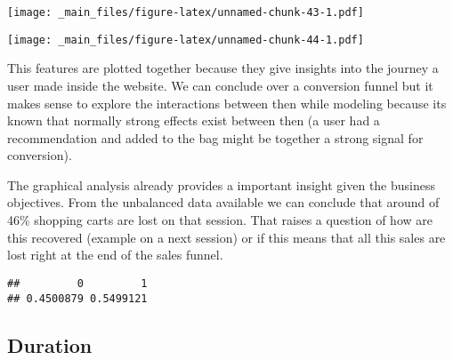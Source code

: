 \documentclass[
]{book}
\newenvironment{Shaded}{\begin{snugshade}}{\end{snugshade}}
\newcommand{\DecValTok}[1]{\textcolor[rgb]{0.00,0.00,0.81}{#1}}
\newcommand{\FunctionTok}[1]{\textcolor[rgb]{0.00,0.00,0.00}{#1}}
\newcommand{\NormalTok}[1]{#1}
\newcommand{\SpecialCharTok}[1]{\textcolor[rgb]{0.00,0.00,0.00}{#1}}
\begin{document}
\texttt{[image: \_main\_files/figure-latex/unnamed-chunk-43-1.pdf]}

\begin{Shaded}
\end{Shaded}

\texttt{[image: \_main\_files/figure-latex/unnamed-chunk-44-1.pdf]}

This features are plotted together because they give insights into the journey a user made inside the website. We can conclude over a conversion funnel but it makes sense to explore the interactions between then while modeling because its known that normally strong effects exist between then (a user had a recommendation and added to the bag might be together a strong signal for conversion).

The graphical analysis already provides a important insight given the business objectives. From the unbalanced data available we can conclude that around of 46\% shopping carts are lost on that session. That raises a question of how are this recovered (example on a next session) or if this means that all this sales are lost right at the end of the sales funnel.

\begin{Shaded}
\end{Shaded}

\begin{verbatim}
##         0         1 
## 0.4500879 0.5499121
\end{verbatim}

\hypertarget{duration}{%
\subsection{Duration}\label{duration}}
\end{document}
